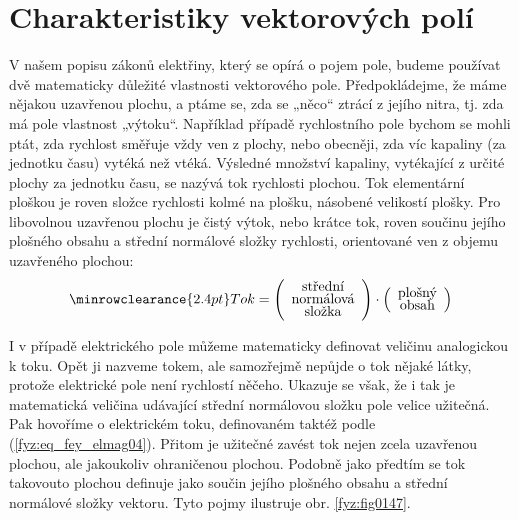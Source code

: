   \section{Charakteristiky vektorových polí}
    V našem popisu zákonů elektřiny, který se opírá o pojem pole, budeme používat dvě matematicky 
    důležité vlastnosti vektorového pole. Předpokládejme, že máme nějakou uzavřenou plochu, a ptáme 
    se, zda se „něco“ ztrácí z jejího nitra, tj. zda má pole vlastnost „výtoku“. Například případě 
    rychlostního pole bychom se mohli ptát, zda rychlost směřuje vždy ven z plochy, nebo obecněji, 
    zda víc kapaliny (za jednotku času) vytéká než vtéká. Výsledné množství kapaliny, vytékající z 
    určité plochy za jednotku času, se nazývá tok rychlosti plochou. Tok elementární ploškou je 
    roven složce rychlosti kolmé na plošku, násobené velikostí plošky. Pro libovolnou uzavřenou 
    plochu je čistý výtok, nebo krátce tok, roven součinu jejího plošného obsahu a střední 
    normálové složky rychlosti, orientované ven z objemu uzavřeného plochou:    
    \begin{equation}\label{fyz:eq_fey_elmag04}
      \renewcommand\arraystretch{0.6} \setlength\minrowclearance{2.4pt}
      \text{Tok} = 
        \left(\begin{array}{c}
          \text{střední}      \\
          \text{normálová} \\
          \text{složka}
        \end{array}
      \right)\cdot
      \left(\begin{array}{c}
          \text{plošný}      \\
          \text{obsah}
        \end{array}
      \right)
    \end{equation}
    

    I v případě elektrického pole můžeme matematicky definovat veličinu analogickou k toku. Opět ji
    nazveme tokem, ale samozřejmě nepůjde o tok nějaké látky, protože elektrické pole není rychlostí
    něčeho. Ukazuje se však, že i tak je matematická veličina udávající střední normálovou složku
    pole velice užitečná. Pak hovoříme o elektrickém toku, definovaném taktéž podle
    (\ref{fyz:eq_fey_elmag04}). Přitom je užitečné zavést tok nejen zcela uzavřenou plochou, ale
    jakoukoliv ohraničenou plochou. Podobně jako předtím se tok takovouto plochou definuje jako
    součin jejího plošného obsahu a střední normálové složky vektoru. Tyto pojmy ilustruje obr.
    \ref{fyz:fig0147}. 
    
